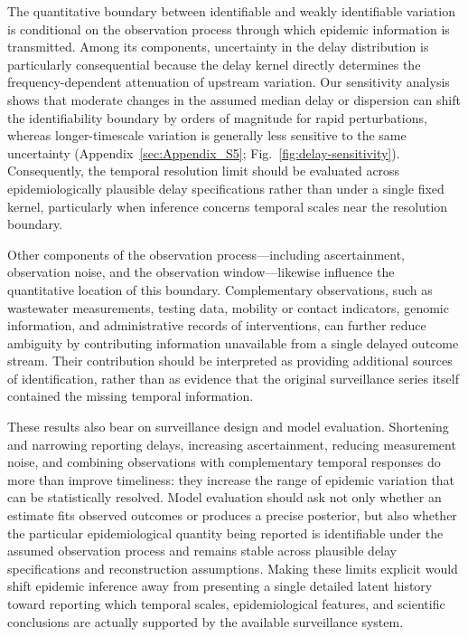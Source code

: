 The quantitative boundary between identifiable and weakly identifiable variation is conditional on the observation process through which epidemic information is transmitted. Among its components, uncertainty in the delay distribution is particularly consequential because the delay kernel directly determines the frequency-dependent attenuation of upstream variation. Our sensitivity analysis shows that moderate changes in the
assumed median delay or dispersion can shift the identifiability boundary by orders of magnitude for rapid perturbations, whereas longer-timescale variation is generally less sensitive to the same uncertainty (Appendix~\ref{sec:Appendix_S5}; Fig.~\ref{fig:delay-sensitivity}). Consequently, the temporal resolution limit should be evaluated across epidemiologically plausible delay specifications rather than under a single fixed kernel,
particularly when inference concerns temporal scales near the resolution boundary.

Other components of the observation process—including ascertainment, observation noise, and the observation window—likewise influence the quantitative location of this boundary. Complementary observations, such as wastewater measurements, testing data, mobility or contact indicators, genomic information, and administrative records of interventions, can further reduce ambiguity by contributing information unavailable from a
single delayed outcome stream. Their contribution should be interpreted as providing additional sources of identification, rather than as evidence that the original surveillance series itself contained the missing temporal information.

These results also bear on surveillance design and model evaluation. Shortening and narrowing reporting delays, increasing ascertainment, reducing measurement noise, and combining observations with complementary temporal responses do more than improve timeliness: they increase the range of epidemic variation that can be statistically resolved. Model evaluation should ask not only whether an estimate fits observed outcomes or produces a precise posterior, but also whether the particular epidemiological quantity being reported is identifiable under the assumed observation process and remains stable across plausible delay specifications and reconstruction assumptions. Making these limits explicit would shift epidemic inference away from presenting a single detailed latent history toward reporting which temporal scales, epidemiological features, and scientific conclusions are actually supported by the available surveillance system.
